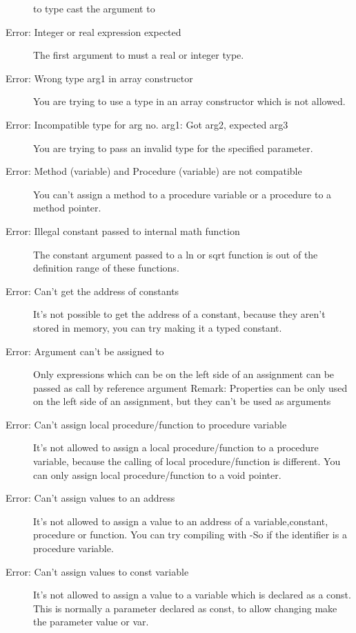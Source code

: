 \begin{description}
 to type cast the argument to 
\item [Error: Integer or real expression expected]
 The first argument to  must a real or integer type.
\item [Error: Wrong type arg1 in array constructor]
 You are trying to use a type in an array constructor which is not
 allowed.
\item [Error: Incompatible type for arg no. arg1: Got arg2, expected arg3]
 You are trying to pass an invalid type for the specified parameter.
\item [Error: Method (variable) and Procedure (variable) are not compatible]
 You can't assign a method to a procedure variable or a procedure to a
 method pointer.
\item [Error: Illegal constant passed to internal math function]
 The constant argument passed to a ln or sqrt function is out of
 the definition range of these functions.
\item [Error: Can't get the address of constants]
 It's not possible to get the address of a constant, because they
 aren't stored in memory, you can try making it a typed constant.
\item [Error: Argument can't be assigned to]
 Only expressions which can be on the left side of an
 assignment can be passed as call by reference argument
 Remark: Properties can be only
 used on the left side of an assignment, but they can't be used as arguments
\item [Error: Can't assign local procedure/function to procedure variable]
 It's not allowed to assign a local procedure/function to a
 procedure variable, because the calling of local procedure/function is
 different. You can only assign local procedure/function to a void pointer.
\item [Error: Can't assign values to an address]
 It's not allowed to assign a value to an address of a variable,constant,
 procedure or function. You can try compiling with -So if the identifier
 is a procedure variable.
\item [Error: Can't assign values to const variable]
 It's not allowed to assign a value to a variable which is declared
 as a const. This is normally a parameter declared as const, to allow
 changing make the parameter value or var.
 \end{description}
